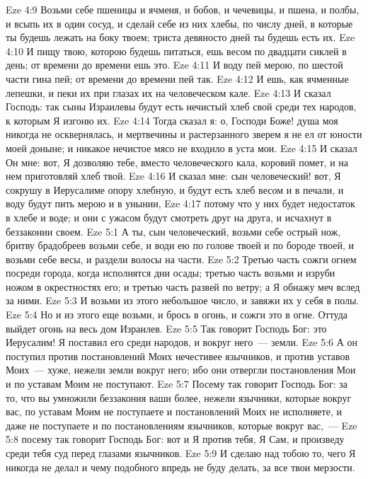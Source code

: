 \vs Eze 4:9 Возьми себе пшеницы и ячменя, и бобов, и чечевицы, и пшена, и полбы, и всыпь их в один сосуд, и сделай себе из них хлебы, по числу дней, в которые ты будешь лежать на боку твоем; триста девяносто дней ты будешь есть их.
\vs Eze 4:10 И пищу твою, которою будешь питаться, ешь весом по двадцати сиклей в день; от времени до времени ешь это.
\vs Eze 4:11 И воду пей мерою, по шестой части гина пей; от времени до времени пей так.
\vs Eze 4:12 И ешь, как ячменные лепешки, и пеки их при глазах их на человеческом кале.
\vs Eze 4:13 И сказал Господь: так сыны Израилевы будут есть нечистый хлеб свой среди тех народов, к которым Я изгоню их.
\vs Eze 4:14 Тогда сказал я: о, Господи Боже! душа моя никогда не осквернялась, и мертвечины и растерзанного зверем я не ел от юности моей доныне; и никакое нечистое мясо не входило в уста мои.
\vs Eze 4:15 И сказал Он мне: вот, Я дозволяю тебе, вместо человеческого кала, коровий помет, и на нем приготовляй хлеб твой.
\vs Eze 4:16 И сказал мне: сын человеческий! вот, Я сокрушу в Иерусалиме опору хлебную, и будут есть хлеб весом и в печали, и воду будут пить мерою и в унынии,
\vs Eze 4:17 потому что у них будет недостаток в хлебе и воде; и они с ужасом будут смотреть друг на друга, и исчахнут в беззаконии своем.
\vs Eze 5:1 А ты, сын человеческий, возьми себе острый нож, бритву брадобреев возьми себе, и води ею по голове твоей и по бороде твоей, и возьми себе весы, и раздели волосы на части.
\vs Eze 5:2 Третью часть сожги огнем посреди города, когда исполнятся дни осады; третью часть возьми и изруби ножом в окрестностях его; и третью часть развей по ветру; а Я обнажу меч вслед за ними.
\vs Eze 5:3 И возьми из этого небольшое число, и завяжи их у себя в полы.
\vs Eze 5:4 Но и из этого еще возьми, и брось в огонь, и сожги это в огне. Оттуда выйдет огонь на весь дом Израилев.
\rsbpar\vs Eze 5:5 Так говорит Господь Бог: это Иерусалим! Я поставил его среди народов, и вокруг него~--- земли.
\vs Eze 5:6 А он поступил против постановлений Моих нечестивее язычников, и против уставов Моих~--- хуже, нежели земли вокруг него; ибо они отвергли постановления Мои и по уставам Моим не поступают.
\vs Eze 5:7 Посему так говорит Господь Бог: за то, что вы умножили беззакония ваши более, нежели язычники, которые вокруг вас, по уставам Моим не поступаете и постановлений Моих не исполняете, и даже не поступаете и по постановлениям язычников, которые вокруг вас,~---
\vs Eze 5:8 посему так говорит Господь Бог: вот и Я против тебя, Я Сам, и произведу среди тебя суд перед глазами язычников.
\vs Eze 5:9 И сделаю над тобою то, чего Я никогда не делал и чему подобного впредь не буду делать, за все твои мерзости.
